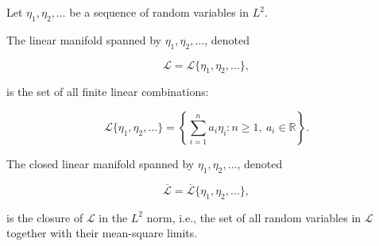 Let $\eta_1, \eta_2, \ldots$ be a sequence of random variables in $L^2$.

The linear manifold spanned by $\eta_1, \eta_2, \ldots$, denoted

$$\mathcal{L} = \mathcal{L}\{\eta_1, \eta_2, \ldots\},$$

is the set of all finite linear combinations:

$$\mathcal{L}\{\eta_1, \eta_2, \ldots\} = \left\{ \sum_{i=1}^{n} a_i \eta_i : n \geq 1,\ a_i \in \mathbb{R} \right\}.$$

The closed linear manifold spanned by $\eta_1, \eta_2, \ldots$, denoted

$$\overline{\mathcal{L}} = \overline{\mathcal{L}}\{\eta_1, \eta_2, \ldots\},$$

is the closure of $\mathcal{L}$ in the $L^2$ norm, i.e., the set of all random variables in $\mathcal{L}$ together with their mean-square limits.
